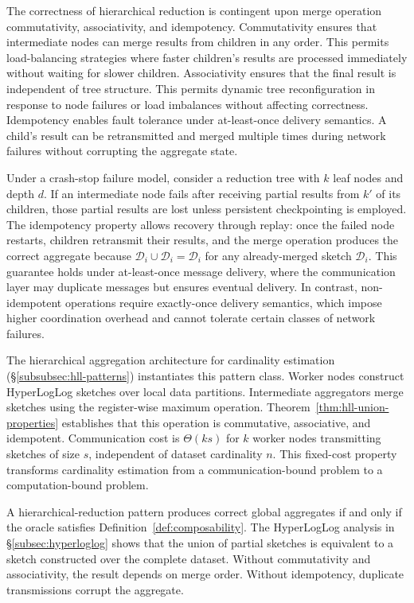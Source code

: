 The correctness of hierarchical reduction is contingent upon merge operation commutativity, associativity, and idempotency. Commutativity ensures that intermediate nodes can merge results from children in any order. This permits load-balancing strategies where faster children's results are processed immediately without waiting for slower children. Associativity ensures that the final result is independent of tree structure. This permits dynamic tree reconfiguration in response to node failures or load imbalances without affecting correctness. Idempotency enables fault tolerance under at-least-once delivery semantics. A child's result can be retransmitted and merged multiple times during network failures without corrupting the aggregate state.

Under a crash-stop failure model, consider a reduction tree with $k$ leaf nodes and depth $d$. If an intermediate node fails after receiving partial results from $k'$ of its children, those partial results are lost unless persistent checkpointing is employed. The idempotency property allows recovery through replay: once the failed node restarts, children retransmit their results, and the merge operation produces the correct aggregate because $\mathcal{D}_i \cup \mathcal{D}_i = \mathcal{D}_i$ for any already-merged sketch $\mathcal{D}_i$. This guarantee holds under at-least-once message delivery, where the communication layer may duplicate messages but ensures eventual delivery. In contrast, non-idempotent operations require exactly-once delivery semantics, which impose higher coordination overhead and cannot tolerate certain classes of network failures.

The hierarchical aggregation architecture for cardinality estimation (\S\ref{subsubsec:hll-patterns}) instantiates this pattern class. Worker nodes construct HyperLogLog sketches over local data partitions. Intermediate aggregators merge sketches using the register-wise maximum operation. Theorem~\ref{thm:hll-union-properties} establishes that this operation is commutative, associative, and idempotent. Communication cost is $\Theta(ks)$ for $k$ worker nodes transmitting sketches of size $s$, independent of dataset cardinality $n$. This fixed-cost property transforms cardinality estimation from a communication-bound problem to a computation-bound problem.

A hierarchical-reduction pattern produces correct global aggregates if and only if the oracle satisfies Definition~\ref{def:composability}. The HyperLogLog analysis in \S\ref{subsec:hyperloglog} shows that the union of partial sketches is equivalent to a sketch constructed over the complete dataset. Without commutativity and associativity, the result depends on merge order. Without idempotency, duplicate transmissions corrupt the aggregate.

